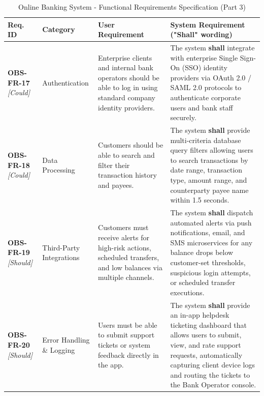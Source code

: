\documentclass[11pt,a4paper]{article}
\begin{document}
\begin{table}[H]
\centering
\caption{Online Banking System - Functional Requirements Specification (Part 3)}
\label{tab:functional_reqs_3}
\footnotesize
\singlespacing
\begin{tabular}{p{2.0cm} p{2.2cm} p{3.8cm} p{5.4cm}}
\toprule
\textbf{Req. ID} & \textbf{Category} & \textbf{User Requirement} & \textbf{System Requirement ("Shall" wording)} \\ \midrule

\textbf{OBS-FR-17} \newline \textit{\small [Could]} & Authentication & Enterprise clients and internal bank operators should be able to log in using standard company identity providers. & The system \textbf{shall} integrate with enterprise Single Sign-On (SSO) identity providers via OAuth 2.0 / SAML 2.0 protocols to authenticate corporate users and bank staff securely. \\ \midrule

\textbf{OBS-FR-18} \newline \textit{\small [Could]} & Data Processing & Customers should be able to search and filter their transaction history and payees. & The system \textbf{shall} provide multi-criteria database query filters allowing users to search transactions by date range, transaction type, amount range, and counterparty payee name within 1.5 seconds. \\ \midrule

\textbf{OBS-FR-19} \newline \textit{\small [Should]} & Third-Party Integrations & Customers must receive alerts for high-risk actions, scheduled transfers, and low balances via multiple channels. & The system \textbf{shall} dispatch automated alerts via push notifications, email, and SMS microservices for any balance drops below customer-set thresholds, suspicious login attempts, or scheduled transfer executions. \\ \midrule

\textbf{OBS-FR-20} \newline \textit{\small [Should]} & Error Handling \& Logging & Users must be able to submit support tickets or system feedback directly in the app. & The system \textbf{shall} provide an in-app helpdesk ticketing dashboard that allows users to submit, view, and rate support requests, automatically capturing client device logs and routing the tickets to the Bank Operator console. \\ \bottomrule
\end{tabular}
\end{table}
\end{document}
